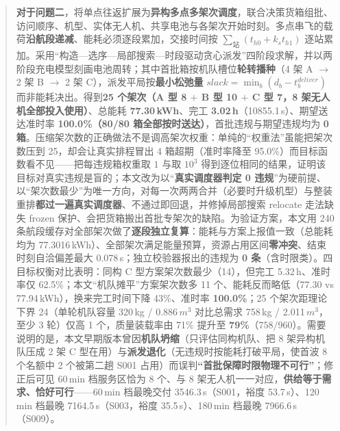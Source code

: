 \begin{abstract}
	\textbf{对于问题二}，将单点往返扩展为\textbf{异构多点多架次调度}，联合决策货箱组批、访问顺序、机型、实体无人机、共享电池与各架次开始时刻。多点串飞的载荷\textbf{沿航段递减}、能耗必须逐段累加，交接时间按 $\sum_{\text{站}}(t_{h0}+k_s t_{h1})$ 逐站累加。采用“构造—选序—局部搜索—时段驱动贪心派发”四阶段求解，并以两阶段充电模型刻画电池周转；其中首批箱按机队槽位\textbf{轮转播种}（4 架 A $\to$ 2 架 B $\to$ 2 架 C），派发平局按\textbf{最小松弛量} $slack=\min_{b}(d_{b}-t_{b}^{deliver})$ 而非能耗决出。得到\textbf{25 个架次（A 型 8 $+$ B 型 10 $+$ C 型 7，8 架无人机全部投入使用）}、总能耗 \textbf{77.30\,kWh}、完工 \textbf{3.02\,h}（10855.1\,s）、期望送达准时率 \textbf{100.0\%（80/80 箱全部按时送达）}，首批违规与期望违规均为 \textbf{0 箱}。压缩架次数的正确做法不是调高架次权重：单纯的“权重法”虽能把架次数压到 25，却会让真实排程冒出 4 箱超期（准时率降至 95.0\%）而目标函数看不见——把每违规箱权重取 $1$ 与取 $10^{3}$ 得到逐位相同的结果，证明该目标对真实违规是盲的；本文改为以“\textbf{真实调度器判定 0 违规}”为硬前提、以“架次数最少”为唯一方向，对每一次两两合并（必要时升级机型）与整装重排\textbf{都过一遍真实调度器}、不通过即回退，并修掉局部搜索 relocate 走法缺失 frozen 保护、会把货箱搬出首批专架次的缺陷。为验证方案，本文用 240 条航段缓存对全部架次做了\textbf{逐段独立复算}：能耗与方案上报值一致（总能耗均为 77.3016\,kWh）、全部架次满足能量预算，资源占用区间\textbf{零冲突}、结束时刻自洽偏差最大 0.078\,s；独立校验器报出的违规为 \textbf{0 条}（含时限类）。四目标权衡对比表明：同构 C 型方案架次数最少（14），但完工 5.32\,h、准时率仅 62.5\%；本文“机队摊平”方案架次数多 11 个、能耗反而略低（77.30 vs 77.94\,kWh），换来完工时间下降 43\%、准时率 \textbf{100.0\%}；25 个架次距理论下界 24（单轮机队容量 320\,kg / 0.886\,$m^{3}$ 对比总需求 758\,kg / 2.011\,$m^{3}$，至少 3 轮）仅高 1 个，质量装载率由 71\% 提升至 \textbf{79\%}（$758/960$）。需要说明的是，本文早期版本曾因\textbf{机队坍缩}（只评估同构机队、把 8 架异构机队压成 2 架 C 型在用）与\textbf{派发退化}（无违规时按能耗打破平局，使首波 8 个名额中 2 个被第二趟 S001 占用）而误判\textbf{“首批保障时限物理不可行”}；修正后可见 60\,min 档服务区恰为 8 个、与 8 架无人机一一对应，\textbf{供给等于需求、恰好可行}——60\,min 档最晚交付 3546.3\,s（S001，裕度 53.7\,s）、120\,min 档最晚 7164.5\,s（S003，裕度 35.5\,s）、180\,min 档最晚 7966.6\,s（S009）。


\end{abstract}
